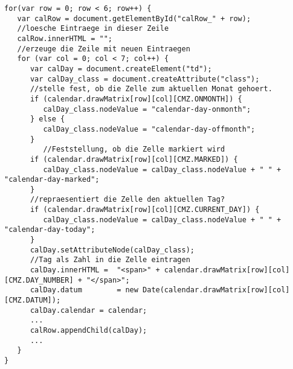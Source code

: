 \begin{lstlisting}[caption={Ablauf der redrawCalendarWidget-Funktion}]
for(var row = 0; row < 6; row++) {            
   var calRow = document.getElementById("calRow_" + row);
   //loesche Eintraege in dieser Zeile
   calRow.innerHTML = "";
   //erzeuge die Zeile mit neuen Eintraegen
   for (var col = 0; col < 7; col++) {                
      var calDay = document.createElement("td");
      var calDay_class = document.createAttribute("class");         
      //stelle fest, ob die Zelle zum aktuellen Monat gehoert.    
      if (calendar.drawMatrix[row][col][CMZ.ONMONTH]) {                    
         calDay_class.nodeValue = "calendar-day-onmonth";
      } else {                    
         calDay_class.nodeValue = "calendar-day-offmonth";
      }
         //Feststellung, ob die Zelle markiert wird                
      if (calendar.drawMatrix[row][col][CMZ.MARKED]) {                                    
         calDay_class.nodeValue = calDay_class.nodeValue + " " + "calendar-day-marked";
      }
      //repraesentiert die Zelle den aktuellen Tag?               
      if (calendar.drawMatrix[row][col][CMZ.CURRENT_DAY]) {                   
         calDay_class.nodeValue = calDay_class.nodeValue + " " + "calendar-day-today";
      }  
      calDay.setAttributeNode(calDay_class);
      //Tag als Zahl in die Zelle eintragen
      calDay.innerHTML =  "<span>" + calendar.drawMatrix[row][col][CMZ.DAY_NUMBER] + "</span>";                            
      calDay.datum        = new Date(calendar.drawMatrix[row][col][CMZ.DATUM]);  
      calDay.calendar = calendar;                            
      ...                        
      calRow.appendChild(calDay);
      ...
   }
}
  
\end{lstlisting}
